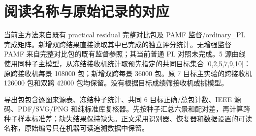 \documentclass[10pt,journal]{IEEEtran}
\begin{document}
\FloatBarrier
\appendices
\section{阅读名称与原始记录的对应}
当前主方法来自既有 practical residual 完整对比包及 PAMF 监督/ordinary\_PL 完成矩阵。新增双跨结果直接读取其中已完成的独立评分统计。无增强监督 PAMF 来自完整对比包的既有监督参照；其当前普通 PL 对照未完成。5 源曲线使用同种子主模型，从冻结接收机统计取预先指定的共同目标集合 [0,2,5,7,9,10]：原跨接收机每景 108000 包；新增双跨每景 36000 包。原 7 目标主实验的跨接收机 126000 包和双跨 42000 包均保留。没有根据目标成绩筛接收机或挑模型。

导出包包含逐图来源表、冻结种子统计、共同 6 目标正确/总包计数、IEEE 源码、PDF/SVG/PNG 和纯标准库复核器。先按种子汇总六景和配对差，再计算跨种子样本标准差；缺失结果保持缺失。正文采用识别器、恢复器和数据设置的可读名称，原始编号只在机器可读追溯数据中保留。

\FloatBarrier
\end{document}
